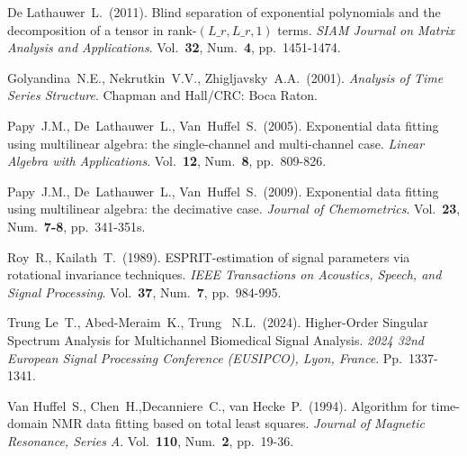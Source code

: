 \documentclass[12pt]{article}
\theoremstyle{definition}
\begin{document}
\begin{thebibliography}{10}
  De Lathauwer~L.~(2011). Blind separation of exponential polynomials and the decomposition of a tensor in rank-$(L\_r,L\_r,1)$ terms. {\sl SIAM Journal on Matrix Analysis and Applications}. Vol.~{\bf 32}, Num.~{\bf 4},
  pp.~1451-1474.

  Golyandina~N.E., Nekrutkin~V.V., Zhigljavsky~A.A.~(2001).
  {\sl Analysis of Time Series Structure}.
  Chapman and Hall/CRC: Boca Raton.
  
  Papy~J.M., De~Lathauwer~L., Van~Huffel~S.~(2005).
  Exponential data fitting using multilinear algebra: the
  single-channel and multi-channel case.
  {\sl Linear Algebra with Applications}. Vol.~{\bf 12}, Num.~{\bf 8},
  pp.~809-826.

  Papy~J.M., De~Lathauwer~L., Van~Huffel~S.~(2009).
  Exponential data fitting using multilinear algebra: the decimative case.
  {\sl Journal of Chemometrics}. Vol.~{\bf 23}, Num.~{\bf 7-8},
  pp.~341-351s.


  Roy~R., Kailath~T.~(1989).
  ESPRIT-estimation of signal parameters via rotational invariance techniques.
  {\sl IEEE Transactions on Acoustics, Speech, and Signal Processing}.
  Vol.~{\bf 37}, Num.~{\bf 7},
  pp.~984-995.
  
  Trung Le~T., Abed-Meraim~K., Trung ~N.L.~(2024). Higher-Order Singular Spectrum Analysis for Multichannel Biomedical Signal Analysis. {\sl 2024 32nd European Signal Processing Conference (EUSIPCO), Lyon, France}. Pp.~1337-1341.


  Van Huffel~S., Chen~H.,Decanniere~C., van Hecke~P.~(1994). Algorithm for time-domain {NMR} data fitting based on total least squares. {\sl Journal of Magnetic Resonance, Series A}. Vol.~{\bf 110}, Num.~{\bf 2},
  pp.~19-36.




\end{thebibliography}
\end{document}
